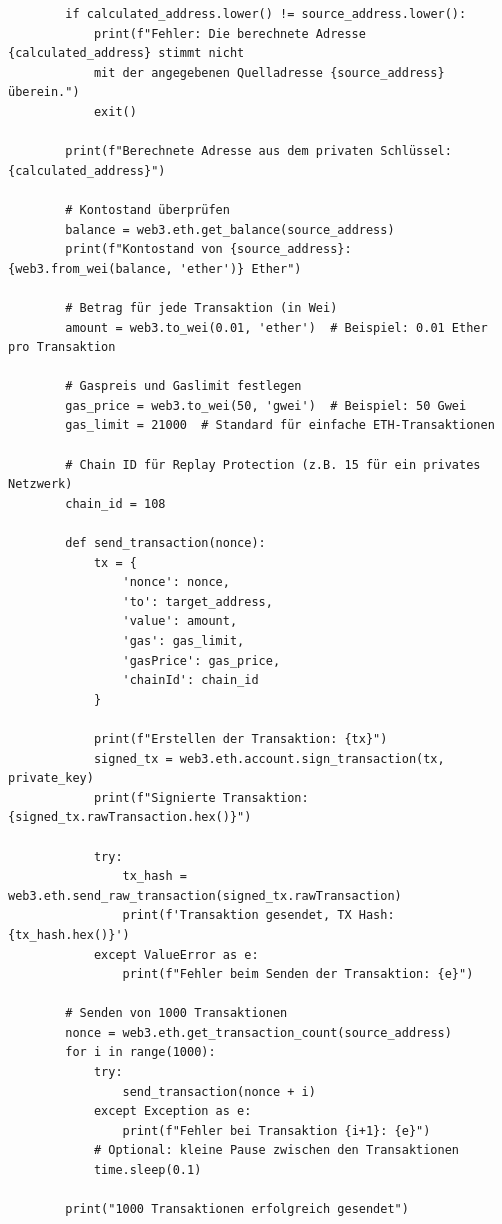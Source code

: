 \documentclass[german]{../uebung}
\begin{document}
\begin{exercise}{1}
\begin{verbatim}
        if calculated_address.lower() != source_address.lower():
            print(f"Fehler: Die berechnete Adresse {calculated_address} stimmt nicht 
            mit der angegebenen Quelladresse {source_address} überein.")
            exit()

        print(f"Berechnete Adresse aus dem privaten Schlüssel: {calculated_address}")

        # Kontostand überprüfen
        balance = web3.eth.get_balance(source_address)
        print(f"Kontostand von {source_address}: {web3.from_wei(balance, 'ether')} Ether")

        # Betrag für jede Transaktion (in Wei)
        amount = web3.to_wei(0.01, 'ether')  # Beispiel: 0.01 Ether pro Transaktion

        # Gaspreis und Gaslimit festlegen
        gas_price = web3.to_wei(50, 'gwei')  # Beispiel: 50 Gwei
        gas_limit = 21000  # Standard für einfache ETH-Transaktionen

        # Chain ID für Replay Protection (z.B. 15 für ein privates Netzwerk)
        chain_id = 108

        def send_transaction(nonce):
            tx = {
                'nonce': nonce,
                'to': target_address,
                'value': amount,
                'gas': gas_limit,
                'gasPrice': gas_price,
                'chainId': chain_id
            }

            print(f"Erstellen der Transaktion: {tx}")
            signed_tx = web3.eth.account.sign_transaction(tx, private_key)
            print(f"Signierte Transaktion: {signed_tx.rawTransaction.hex()}")
            
            try:
                tx_hash = web3.eth.send_raw_transaction(signed_tx.rawTransaction)
                print(f'Transaktion gesendet, TX Hash: {tx_hash.hex()}')
            except ValueError as e:
                print(f"Fehler beim Senden der Transaktion: {e}")

        # Senden von 1000 Transaktionen
        nonce = web3.eth.get_transaction_count(source_address)
        for i in range(1000):
            try:
                send_transaction(nonce + i)
            except Exception as e:
                print(f"Fehler bei Transaktion {i+1}: {e}")
            # Optional: kleine Pause zwischen den Transaktionen
            time.sleep(0.1)

        print("1000 Transaktionen erfolgreich gesendet")

    \end{verbatim}
\end{exercise}
\end{document}
